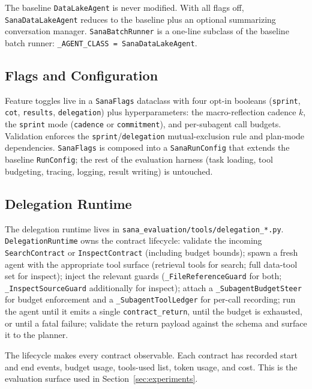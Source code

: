 The baseline \texttt{DataLakeAgent} is never modified. With all flags off, \texttt{SanaDataLakeAgent} reduces to the baseline plus an optional summarizing conversation manager. \texttt{SanaBatchRunner} is a one-line subclass of the baseline batch runner: \texttt{\_AGENT\_CLASS = SanaDataLakeAgent}.

\subsection{Flags and Configuration}

Feature toggles live in a \texttt{SanaFlags} dataclass with four opt-in booleans (\texttt{sprint}, \texttt{cot}, \texttt{results}, \texttt{delegation}) plus hyperparameters: the macro-reflection cadence $k$, the \texttt{sprint} mode (\texttt{cadence} or \texttt{commitment}), and per-subagent call budgets. Validation enforces the \texttt{sprint}/\texttt{delegation} mutual-exclusion rule and plan-mode dependencies. \texttt{SanaFlags} is composed into a \texttt{SanaRunConfig} that extends the baseline \texttt{RunConfig}; the rest of the evaluation harness (task loading, tool budgeting, tracing, logging, result writing) is untouched.

\subsection{Delegation Runtime}

The delegation runtime lives in \texttt{sana\_evaluation/tools/delegation\_*.py}. \texttt{DelegationRuntime} owns the contract lifecycle: validate the incoming \texttt{SearchContract} or \texttt{InspectContract} (including budget bounds); spawn a fresh agent with the appropriate tool surface (retrieval tools for search; full data-tool set for inspect); inject the relevant guards (\texttt{\_FileReferenceGuard} for both; \texttt{\_InspectSourceGuard} additionally for inspect); attach a \texttt{\_SubagentBudgetSteer} for budget enforcement and a \texttt{\_SubagentToolLedger} for per-call recording; run the agent until it emits a single \texttt{contract\_return}, until the budget is exhausted, or until a fatal failure; validate the return payload against the schema and surface it to the planner.

The lifecycle makes every contract observable. Each contract has recorded start and end events, budget usage, tools-used list, token usage, and cost. This is the evaluation surface used in Section~\ref{sec:experiments}.
